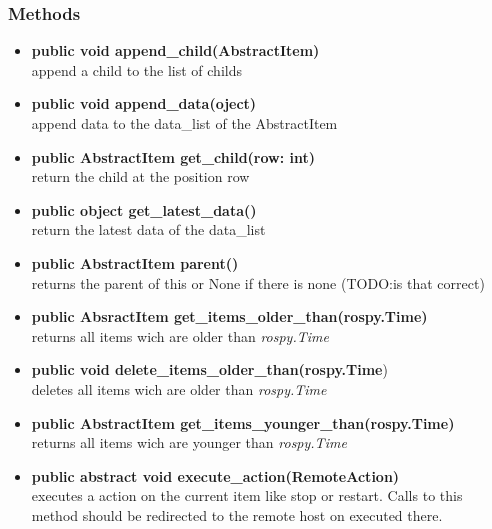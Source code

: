 \subsubsection{Methods}
\begin{itemize}
   \item \textbf{public void append\_child(AbstractItem)}\\ 
   append a child to the list of childs
  \item \textbf{public void append\_data(oject)}\\ 
  append data to the data\_list of the AbstractItem
  \item \textbf{public AbstractItem get\_child(row: int)}\\ 
  return the child at the position row
  \item \textbf{public object get\_latest\_data()}\\ 
  return the latest data of the data\_list
  \item \textbf{public AbstractItem parent()}\\ 
  returns the parent of this or None if there is none (TODO:is that correct)
  \item \textbf{public AbsractItem get\_items\_older\_than(rospy.Time)}\\
  returns all items wich are older than \textit{rospy.Time}
  \item \textbf{public void delete\_items\_older\_than(rospy.Time})\\
  deletes all items wich are older than \textit{rospy.Time}
  \item \textbf{public AbstractItem get\_items\_younger\_than(rospy.Time)}\\
  returns all items wich are younger than \textit{rospy.Time}
  \item \textbf{public abstract void execute\_action(RemoteAction)}\\ 
  executes a action on the current item like stop or restart. Calls to this
  method should be redirected to the remote host on executed there.
\end{itemize}

